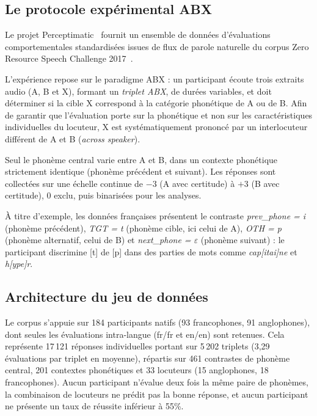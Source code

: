 \documentclass{article}
\begin{document}
\subsection{Le protocole expérimental ABX}

Le projet Perceptimatic~\cite{perceptimatic2020} fournit un ensemble de
données d'évaluations comportementales standardisées issues de flux de
parole naturelle du corpus Zero Resource Speech Challenge
2017~\cite{zerospeech2017}.

L'expérience repose sur le paradigme ABX : un
participant écoute trois extraits audio (A, B et X), formant un \emph{triplet
ABX}, de durées variables, et doit déterminer si la cible X correspond à la
catégorie phonétique de A ou de B. Afin de garantir que l'évaluation porte
sur la phonétique et non sur les caractéristiques individuelles du locuteur,
X est systématiquement prononcé par un interlocuteur différent de A et B
(\textit{across speaker}).

Seul le phonème central varie entre A et B, dans un contexte phonétique
strictement identique (phonème précédent et suivant). Les réponses sont
collectées sur une échelle continue de $-3$ (A avec certitude) à $+3$ (B
avec certitude), 0 exclu, puis binarisées pour les analyses.

À titre d'exemple, les données françaises présentent le contraste
\textit{prev\_phone = i} (phonème précédent), \textit{TGT = t} (phonème
cible, ici celui de A), \textit{OTH = p} (phonème alternatif, celui de B) et
\textit{next\_phone = $\varepsilon$} (phonème suivant) : le participant
discrimine [t] de [p] dans des parties de mots comme \textit{cap[itai]ne} et
\textit{h[ype]r}.

\subsection{Architecture du jeu de données}

Le corpus s'appuie sur 184 participants natifs (93 francophones, 91
anglophones), dont seules les évaluations
intra-langue (fr/fr et en/en) sont retenues. Cela représente 17\,121
réponses individuelles portant sur 5\,202 triplets (3,29
évaluations par triplet en moyenne), répartis sur 461 contrastes de phonème
central, 201 contextes phonétiques et 33 locuteurs (15 anglophones, 18
francophones). Aucun participant n'évalue deux fois la même paire de
phonèmes, la combinaison de locuteurs ne prédit pas la bonne réponse, et
aucun participant ne présente un taux de réussite inférieur à 55\%.
\end{document}
